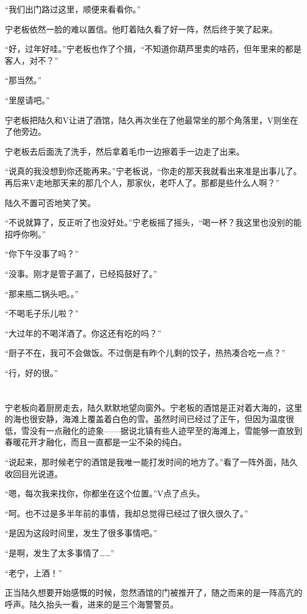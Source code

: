 “我们出门路过这里，顺便来看看你。”

宁老板依然一脸的难以置信。他盯着陆久看了好一阵，然后终于笑了起来。

“好，过年好哇。”宁老板也作了个揖，“不知道你葫芦里卖的啥药，但年里来的都是客人，对不？”

“那当然。”

“里屋请吧。”

宁老板把陆久和V让进了酒馆，陆久再次坐在了他最常坐的那个角落里，V则坐在了他旁边。

宁老板去后面洗了洗手，然后拿着毛巾一边擦着手一边走了出来。

“说真的我没想到你还能再来。”宁老板说，“你走的那天我就看出来准是出事儿了。再后来V走地那天来的那几个人，那家伙，老吓人了。那都是些什么人啊？”

陆久不置可否地笑了笑。

“不说就算了，反正听了也没好处。”宁老板摇了摇头，“喝一杯？我这里也没别的能招呼你咧。”

“你下午没事了吗？”

“没事。刚才是管子漏了，已经捣鼓好了。”

“那来瓶二锅头吧。。”

“不喝毛子乐儿啦？”

“大过年的不喝洋酒了。你这还有吃的吗？”

“厨子不在，我可不会做饭。不过倒是有昨个儿剩的饺子，热热凑合吃一点？”

“行，好的很。”

\section*{}

宁老板向着厨房走去，陆久默默地望向窗外。宁老板的酒馆是正对着大海的，这里的海也很安静，海滩上覆盖着白色的雪。虽然时间已经过了正午，但因为温度很低，雪没有一点融化的迹象——据说北镇有些人迹罕至的海滩上，雪能够一直放到春暖花开才融化，而且一直都是一尘不染的纯白。

“说起来，那时候老宁的酒馆是我唯一能打发时间的地方了。”看了一阵外面，陆久收回目光说道。

“嗯，每次我来找你，你都坐在这个位置。”V点了点头。

“呵。也不过是多半年前的事情，我却总觉得已经过了很久很久了。”

“是因为这段时间里，发生了很多事情吧。”

“是啊，发生了太多事情了……”

“老宁，上酒！”

正当陆久想要开始感慨的时候，忽然酒馆的门被推开了，随之而来的是一阵高亢的呼声。陆久抬头一看，进来的是三个海警警员。

